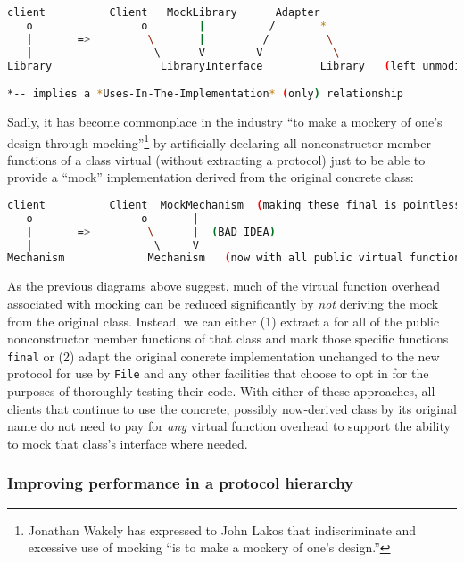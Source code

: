 {{\begin{lstlisting}[language=bash,style=plain]
client          Client   MockLibrary      Adapter
   o                 o        |          /       *
   |       =>         \       |         /         \
   |                   \      V        V           \
Library                 LibraryInterface         Library   (left unmodified)

*-- implies a *Uses-In-The-Implementation* (only) relationship
\end{lstlisting}
    

\noindent Sadly, it has become commonplace in the industry ``to make a mockery of
one's design through mocking''{\cprotect\footnote{Jonathan Wakely has
expressed to John Lakos that indiscriminate and excessive use of
  mocking ``is to make a mockery of one's design.''}} by artificially
declaring all nonconstructor member functions of a class virtual
(without extracting a protocol) just to be able to provide a ``mock''
implementation derived from the original concrete class:

\pagebreak%

\begin{lstlisting}[language=bash,style=plain]
client          Client  MockMechanism  (making these final is pointless)
   o                 o       |
   |       =>         \      |  (BAD IDEA)
   |                   \     V
Mechanism             Mechanism   (now with all public virtual functions)
\end{lstlisting}
    

\noindent As the previous diagrams above suggest, much of the virtual function
overhead associated with mocking can be reduced significantly by
\emph{not} deriving the mock from the original class. Instead, we can
either (1) extract a \emcppsgloss{protocol} for all of the public
nonconstructor member functions of that class and mark those specific
functions \lstinline!final! or (2) adapt the original concrete
implementation unchanged to the new protocol for use by \lstinline!File!
and any other facilities that choose to opt in for the purposes of
thoroughly testing their code. With either of these approaches, all
clients that continue to use the concrete, possibly now-derived class by
its original name do not need to pay for \emph{any} virtual function
overhead to support the ability to mock that class's interface where
needed.

\subsubsection[Improving performance in a protocol hierarchy]{Improving performance in a protocol hierarchy}\label{improving-performance-in-a-protocol-hierarchy}

}}
